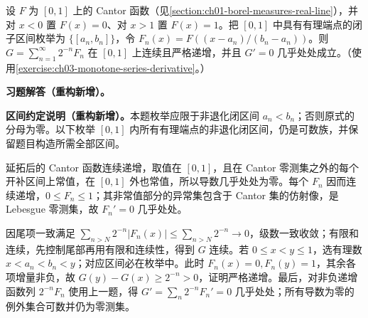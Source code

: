 \documentclass[../../main.tex]{subfiles}%
\begin{document}
\begin{exercise}\label{exercise:ch03-strict-singular-function}
设 $F$ 为 $[0,1]$ 上的 Cantor 函数（见\cref{section:ch01-borel-measures-real-line}），并对 $x<0$ 置 $F(x)=0$、对 $x>1$ 置 $F(x)=1$。把 $[0,1]$ 中具有有理端点的闭子区间枚举为 $\{[a_n,b_n]\}$，令 $F_n(x)=F((x-a_n)/(b_n-a_n))$。则 $G=\sum_{n=1}^{\infty}2^{-n}F_n$ 在 $[0,1]$ 上连续且严格递增，并且 $G'=0$ 几乎处处成立。（使用\cref{exercise:ch03-monotone-series-derivative}。）
\end{exercise}
\begin{solution}
\label{solution:ch03-strict-singular-function}
\textbf{习题解答（重构新增）。}\begin{remark}
\textbf{区间约定说明（重构新增）。}本题枚举应限于非退化闭区间 $a_n<b_n$；否则原式的分母为零。以下枚举 $[0,1]$ 内所有有理端点的非退化闭区间，仍是可数族，并保留题目构造所需全部区间。
\end{remark}
延拓后的 Cantor 函数连续递增，取值在 $[0,1]$，且在 Cantor 零测集之外的每个开补区间上常值，在 $[0,1]$ 外也常值，所以导数几乎处处为零。每个 $F_n$ 因而连续递增，$0\le F_n\le1$；其非常值部分的异常集包含于 Cantor 集的仿射像，是 Lebesgue 零测集，故 $F_n'=0$ 几乎处处。

因尾项一致满足 $\sum_{n>N}2^{-n}|F_n(x)|\le\sum_{n>N}2^{-n}\to0$，级数一致收敛；有限和连续，先控制尾部再用有限和连续性，得到 $G$ 连续。若 $0\le x<y\le1$，选有理数 $x<a_n<b_n<y$；对应区间必在枚举中。此时 $F_n(x)=0,F_n(y)=1$，其余各项增量非负，故 $G(y)-G(x)\ge2^{-n}>0$，证明严格递增。最后，对非负递增函数列 $2^{-n}F_n$ 使用上一题，得 $G'=\sum_n2^{-n}F_n'=0$ 几乎处处；所有导数为零的例外集合可数并仍为零测集。
\end{solution}
\end{document}
